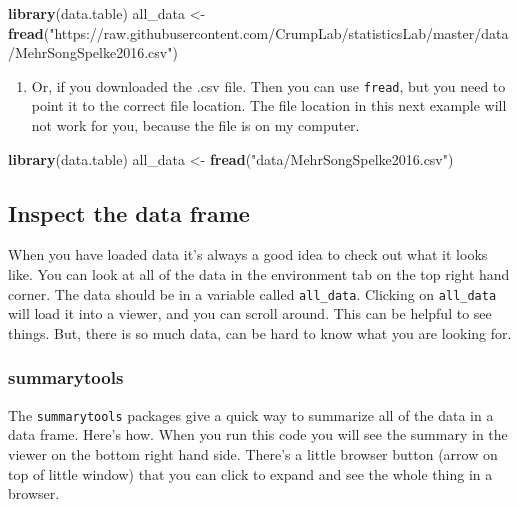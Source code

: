 \documentclass[
]{book}
\newenvironment{Shaded}{\begin{snugshade}}{\end{snugshade}}
\newcommand{\FunctionTok}[1]{\textcolor[rgb]{0.13,0.29,0.53}{\textbf{#1}}}
\newcommand{\NormalTok}[1]{#1}
\newcommand{\OtherTok}[1]{\textcolor[rgb]{0.56,0.35,0.01}{#1}}
\newcommand{\StringTok}[1]{\textcolor[rgb]{0.31,0.60,0.02}{#1}}
\providecommand{\tightlist}{%
  \setlength{\itemsep}{0pt}\setlength{\parskip}{0pt}}
\begin{document}
\begin{Shaded}
\begin{Highlighting}[]
\FunctionTok{library}\NormalTok{(data.table)}
\NormalTok{all\_data }\OtherTok{\textless{}{-}} \FunctionTok{fread}\NormalTok{(}\StringTok{"https://raw.githubusercontent.com/CrumpLab/statisticsLab/master/data/MehrSongSpelke2016.csv"}\NormalTok{)}
\end{Highlighting}
\end{Shaded}

\begin{enumerate}
\def\labelenumi{\arabic{enumi}.}
\setcounter{enumi}{1}
\tightlist
\item
  Or, if you downloaded the .csv file. Then you can use \texttt{fread}, but you need to point it to the correct file location. The file location in this next example will not work for you, because the file is on my computer.
\end{enumerate}

\begin{Shaded}
\begin{Highlighting}[]
\FunctionTok{library}\NormalTok{(data.table)}
\NormalTok{all\_data }\OtherTok{\textless{}{-}} \FunctionTok{fread}\NormalTok{(}\StringTok{"data/MehrSongSpelke2016.csv"}\NormalTok{)}
\end{Highlighting}
\end{Shaded}

\hypertarget{inspect-the-data-frame}{%
\subsection{Inspect the data frame}\label{inspect-the-data-frame}}

When you have loaded data it's always a good idea to check out what it looks like. You can look at all of the data in the environment tab on the top right hand corner. The data should be in a variable called \texttt{all\_data}. Clicking on \texttt{all\_data} will load it into a viewer, and you can scroll around. This can be helpful to see things. But, there is so much data, can be hard to know what you are looking for.

\hypertarget{summarytools-1}{%
\subsubsection{summarytools}\label{summarytools-1}}

The \texttt{summarytools} packages give a quick way to summarize all of the data in a data frame. Here's how. When you run this code you will see the summary in the viewer on the bottom right hand side. There's a little browser button (arrow on top of little window) that you can click to expand and see the whole thing in a browser.
\end{document}
